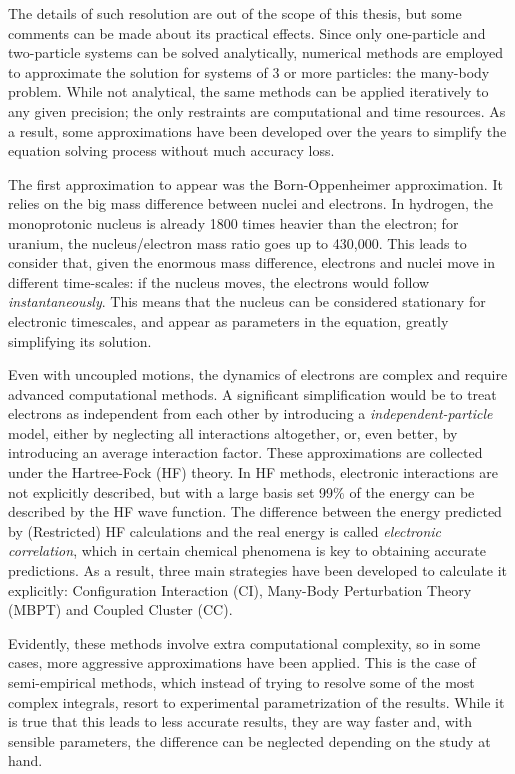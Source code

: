 The details of such resolution are out of the scope of this thesis, but some comments can be made about its practical effects. Since only one-particle and two-particle systems can be solved analytically, numerical methods are employed to approximate the solution for systems of 3 or more particles: the many-body problem. While not analytical, the same methods can be applied iteratively to any given precision; the only restraints are computational and time resources. As a result, some approximations have been developed over the years to simplify the equation solving process without much accuracy loss.

The first approximation to appear was the Born-Oppenheimer approximation. It relies on the big mass difference between nuclei and electrons. In hydrogen, the monoprotonic nucleus is already 1800 times heavier than the electron; for uranium, the nucleus/electron mass ratio goes up to 430,000. This leads to consider that, given the enormous mass difference, electrons and nuclei move in different time-scales: if the nucleus moves, the electrons would follow \textit{instantaneously}. This means that the nucleus can be considered stationary for electronic timescales, and appear as parameters in the equation, greatly simplifying its solution.

Even with uncoupled motions, the dynamics of electrons are complex and require advanced computational methods. A significant simplification would be to treat electrons as independent from each other by introducing a \textit{independent-particle} model, either by neglecting all interactions altogether, or, even better, by introducing an average interaction factor. These approximations are collected under the Hartree-Fock (HF) theory. In HF methods, electronic interactions are not explicitly described, but with a large basis set 99$\%$  of the energy can be described by the HF wave function. The difference between the energy predicted by (Restricted) HF calculations and the real energy is called \textit{electronic correlation}, which in certain chemical phenomena is key to obtaining accurate predictions. As a result, three main strategies have been developed to calculate it explicitly: Configuration Interaction (CI), Many-Body Perturbation Theory (MBPT) and Coupled Cluster (CC).

Evidently, these methods involve extra computational complexity, so in some cases, more aggressive approximations have been applied. This is the case of semi-empirical methods, which instead of trying to resolve some of the most complex integrals, resort to experimental parametrization of the results. While it is true that this leads to less accurate results, they are way faster and, with sensible parameters, the difference can be neglected depending on the study at hand.

